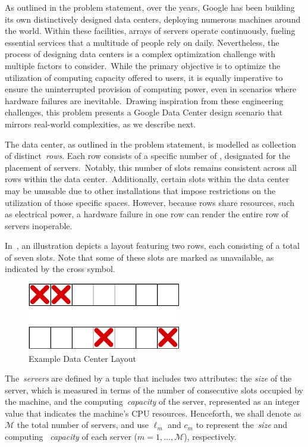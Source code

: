 As outlined in the problem statement, over the years, Google has been building
its own distinctively designed data centers, deploying numerous machines around
the world. Within these facilities, arrays of servers operate continuously,
fueling essential services that a multitude of people rely on daily.
Nevertheless, the process of designing data centers is a complex optimization
challenge with multiple factors to consider.~While the primary objective is to
optimize the utilization of computing capacity offered to users, it is equally
imperative to ensure the uninterrupted provision of computing power, even in
scenarios where hardware failures are inevitable.~Drawing inspiration from
these engineering challenges, this problem presents a Google Data Center design
scenario that mirrors real-world complexities, as we describe next.

The data center, as outlined in the problem statement, is modelled as collection
of distinct~\textit{rows}. Each row consists of a specific number of
, designated for the placement of servers.~Notably, this number
of slots remains consistent across all rows within the data
center.~Additionally, certain slots within the data center may be unusable due
to other installations that impose restrictions on the utilization of those
specific spaces. However, because rows share resources, such as electrical
power, a hardware failure in one row can render the entire row of servers
inoperable.

In~, an illustration depicts a layout featuring two
rows, each consisting of a total of seven slots. Note that some of these slots
are marked as unavailable, as indicated by the cross symbol.

\begin{figure}[h]
  \centering
  \includegraphics[width=0.6\textwidth,keepaspectratio]{../assets/dc/dc-rows-no-labels.pdf}
  \caption{Example Data Center Layout}
  \label{fig:data-center-layout}
\end{figure}

The~\emph{servers} are defined by a tuple that includes two attributes: the
\textit{size} of the server, which is measured in terms of the number of
consecutive slots occupied by the machine, and the computing~\textit{capacity}
of the server, represented as an integer value that indicates the machine's CPU
resources. Henceforth, we shall denote as $\mathcal{M}$ the total number of
servers, and use $\ell_{m}$ and $c_{m}$ to represent the~\emph{size}
and computing ~\emph{capacity} of each server ($m = 1, \ldots, \mathcal{M}$), respectively.

